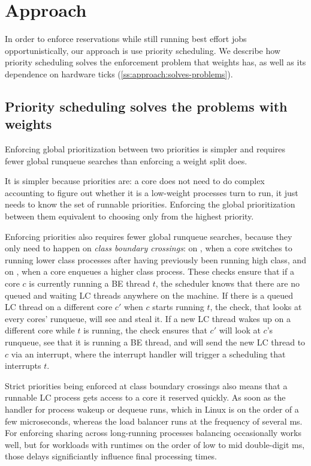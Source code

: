 \section{Approach}\label{s:approach}

In order to enforce reservations while still running best effort jobs
opportunistically, our approach is use priority scheduling. We describe how
priority scheduling solves the enforcement problem that weights has, as well as
its dependence on hardware ticks (\autoref{ss:approach:solves-problems}).

\subsection{Priority scheduling solves the problems with
weights}\label{ss:approach:solves-problems}

Enforcing global prioritization between two priorities is simpler and requires
fewer global runqueue searches than enforcing a weight split does. 

It is simpler because priorities are: a core does not need to do complex
accounting to figure out whether it is a low-weight processes turn to run, it
just needs to know the set of runnable priorities. Enforcing the global
prioritization between them equivalent to choosing only from the highest
priority.

Enforcing priorities also requires fewer global runqueue searches, because they
only need to happen on \textit{class boundary crossings}: on \exit{}, when a
core switches to running lower class processes after having previously been
running high class, and on \entry{}, when a core enqueues a higher class
process. These checks ensure that if a core $c$ is currently running a BE thread
$t$, the scheduler knows that there are no queued and waiting LC threads
anywhere on the machine. If there is a queued LC thread on a different core $c'$
when $c$ starts running $t$, the \exit{} check, that looks at every cores'
runqueue, will see and steal it. If a new LC thread wakes up on a different core
while $t$ is running, the \entry{} check ensures that $c'$ will look at $c$'s
runqueue, see that it is running a BE thread, and will send the new LC thread to
$c$ via an interrupt, where the interrupt handler will trigger a scheduling that
interrupts $t$.

Strict priorities being enforced at class boundary crossings also means that a
runnable LC process gets access to a core it reserved quickly. As soon as the
handler for process wakeup or dequeue runs, which in Linux is on the order of a
few microseconds, whereas the load balancer runs at the frequency of several ms.
For enforcing sharing across long-running processes balancing occasionally works
well, but for workloads with runtimes on the order of low to mid double-digit
ms, those delays significiantly influence final processing times.



